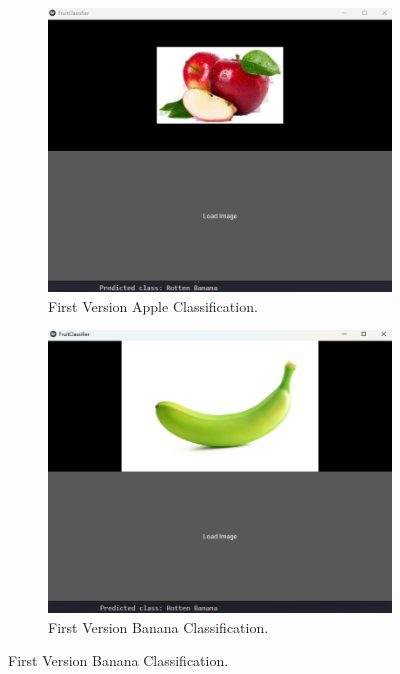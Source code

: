 \documentclass[conference]{IEEEtran}
\begin{document}
\begin{figure}[h]
\begin{subfigure}[b]{0.48\linewidth}
        \label{figFB}
    \end{subfigure}
    \hfill
    \begin{subfigure}[b]{0.48\linewidth}
        \centering
        \includegraphics[width=\linewidth]{1layer appel3.png}
        \caption{First Version Apple Classification.}
        \label{figFB}
    \end{subfigure}
    \hfill
    \begin{subfigure}[b]{0.48\linewidth}
        \centering
        \includegraphics[width=\linewidth]{1layer banana1.png}
        \caption{First Version Banana Classification.}

\end{subfigure}
\end{figure}
\end{document}
